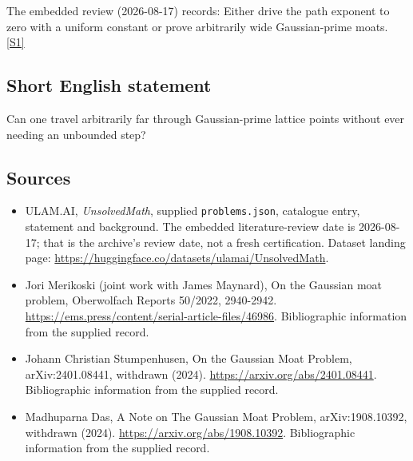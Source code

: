 \documentclass[11pt,a4paper]{article}
\newcommand{\sref}[2]{\hyperlink{source:#1:#2}{[S#2]}}
\begin{document}
The embedded review (2026-08-17) records: Either drive the path exponent to zero with a uniform constant or prove arbitrarily wide Gaussian-prime moats. \sref{statement}{1}

\subsection{Short English statement}

Can one travel arbitrarily far through Gaussian-prime lattice points without ever needing an unbounded step?

\subsection{Sources}

{\small

\begin{itemize}

\item[\hypertarget{source:statement:1}{S1}] ULAM.AI, \emph{UnsolvedMath}, supplied \texttt{problems.json}, catalogue entry, statement and background. The embedded literature-review date is 2026-08-17; that is the archive’s review date, not a fresh certification. Dataset landing page: \url{https://huggingface.co/datasets/ulamai/UnsolvedMath}.

\item[\hypertarget{source:statement:2}{S2}] Jori Merikoski (joint work with James Maynard), On the Gaussian moat problem, Oberwolfach Reports 50/2022, 2940-2942. \url{https://ems.press/content/serial-article-files/46986}. Bibliographic information from the supplied record.

\item[\hypertarget{source:statement:3}{S3}] Johann Christian Stumpenhusen, On the Gaussian Moat Problem, arXiv:2401.08441, withdrawn (2024). \url{https://arxiv.org/abs/2401.08441}. Bibliographic information from the supplied record.

\item[\hypertarget{source:statement:4}{S4}] Madhuparna Das, A Note on The Gaussian Moat Problem, arXiv:1908.10392, withdrawn (2024). \url{https://arxiv.org/abs/1908.10392}. Bibliographic information from the supplied record.

\end{itemize}

}

\label{end:statement}
\end{document}
